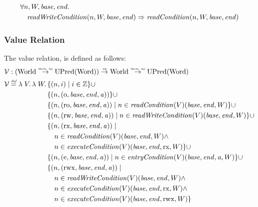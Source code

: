 \documentclass{article}
\newcommand{\monnefun}{\stackrel{\textit{\tiny{mon, ne}}}{\rightarrow}}
\newcommand{\nefun}{\stackrel{\textit{\tiny{ne}}}{\rightarrow}}
\newcommand{\defeq}{\stackrel{\textit{\tiny{def}}}{=}}
\newcommand{\union}{\mathbin{\cup}}
\newcommand{\var}[1]{\mathit{#1}}
\newcommand{\gl}{\var{g}}
\newcommand{\addr}{\var{a}}
\newcommand{\start}{\var{base}}
\newcommand{\addrend}{\var{end}}
\newcommand{\perm}{\var{perm}}
\newcommand{\stdcap}[1][(\perm,\gl)]{\left(#1,\start,\addrend,\addr \right)}
\newcommand{\plainfun}[2]{
  \ifthenelse{\equal{#2}{}}
             {\mathit{#1}}
             {\mathit{#1}(#2)}
}
\newcommand{\readCond}[1]{\plainfun{readCondition}{#1}}
\newcommand{\writeCond}[1]{\plainfun{readWriteCondition}{#1}}
\newcommand{\execCond}[1]{\plainfun{executeCondition}{#1}}
\newcommand{\entryCond}[1]{\plainfun{entryCondition}{#1}}
\newcommand{\asmType}{\plaindom{AsmType}}
\newcommand{\plaindom}[1]{\mathrm{#1}}
\newcommand{\Words}{\plaindom{Word}}
\newcommand{\ints}{\mathbb{Z}}
\newcommand{\Worlds}{\plaindom{World}}
\newcommand{\UPred}[1]{\plaindom{UPred}(#1)}
\newcommand{\intr}[2]{\mathcal{#1}}
\newcommand{\valueintr}[1]{\intr{V}{#1}}
\newcommand{\stdvr}{\valueintr{\asmType}}
\newcommand{\npair}[2][n]{\left(#1,#2 \right)}
\newcommand{\plainperm}[1]{\mathrm{#1}}
\newcommand{\noperm}{\plainperm{o}}
\newcommand{\readonly}{\plainperm{ro}}
\newcommand{\readwrite}{\plainperm{rw}}
\newcommand{\exec}{\plainperm{rx}}
\newcommand{\entry}{\plainperm{e}}
\newcommand{\rwx}{\plainperm{rwx}}
\begin{document}
\begin{lemma}
\label{lem:wc-implies-rc}
  \begin{align*}
    &\forall n, W, \start, \addrend \ldotp\\ 
    &\quad \writeCond{n,W,\start,\addrend} \Rightarrow \readCond{n,W,\start,\addrend}
  \end{align*}
\end{lemma}


\subsubsection{Value Relation}
\label{subsubsec:value-relation}
The value relation, is defined as follows:
\begin{align*}
  \stdvr & :  (\Worlds \monnefun \UPred{\Words}) \nefun \Worlds \monnefun \UPred{\Words} \\
  \stdvr &\defeq \lambda \; V \ldotp \lambda \; W \ldotp 
              \begin{aligned}[t]
  & \{ \npair{i} \mid i \in \ints \} 
    \union \\
         & \{ \npair{\stdcap[\noperm] }  \} 
           \union \\
         & \{ \npair{\stdcap[\readonly] } \mid n \in \readCond{}(V)(\start,\addrend,W) \} \union \\
         & \{ \npair{\stdcap[\readwrite] } \mid n \in \writeCond{}(V)(\start,\addrend,W) \} \union \\
         & \{ \npair{\stdcap[\exec]} \mid \\
         & \quad n \in \readCond{}(V)(\start,\addrend,W) \land \\
         & \quad n \in \execCond{}(V)(\start,\addrend,\exec,W) \}
           \union \\
         & \{ \npair{\stdcap[\entry]} \mid n \in \entryCond{}(V)(\start,\addrend,\addr,W) \} \union \\
         & \{ \npair{\stdcap[\rwx]} \mid \\
         & \quad n \in \writeCond{}(V)(\start,\addrend,W) \land \\
         & \quad n \in \execCond{}(V)(\start,\addrend,\exec,W) \land \\
         & \quad n \in \execCond{}(V)(\start,\addrend,\rwx,W) \}
       \end{aligned}
\end{align*}
\end{document}
